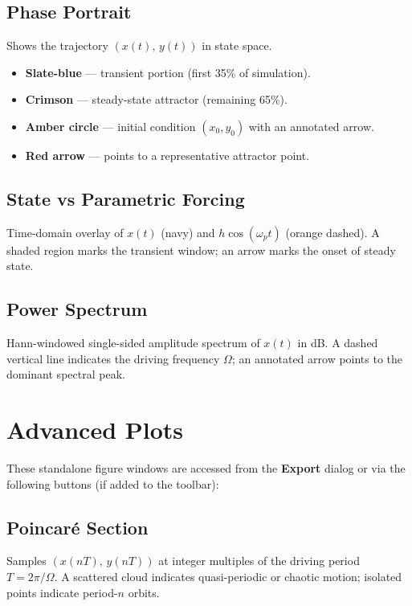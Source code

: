 \documentclass[12pt,a4paper]{article}
\begin{document}
\subsection{Phase Portrait}
Shows the trajectory $(x(t),\, y(t))$ in state space.
\begin{itemize}[noitemsep]
  \item \textbf{Slate-blue} — transient portion (first 35\% of simulation).
  \item \textbf{Crimson} — steady-state attractor (remaining 65\%).
  \item \textbf{Amber circle} — initial condition $(x_0, y_0)$ with an annotated arrow.
  \item \textbf{Red arrow} — points to a representative attractor point.
\end{itemize}

\subsection{State vs Parametric Forcing}
Time-domain overlay of $x(t)$ (navy) and $h\cos(\omega_p t)$ (orange dashed).
A shaded region marks the transient window; an arrow marks the onset of steady state.

\subsection{Power Spectrum}
Hann-windowed single-sided amplitude spectrum of $x(t)$ in dB.
A dashed vertical line indicates the driving frequency $\Omega$; an annotated arrow points to the dominant spectral peak.

\section{Advanced Plots}

These standalone figure windows are accessed from the \textbf{Export} dialog or via the following buttons (if added to the toolbar):

\subsection{Poincar\'e Section}
Samples $(x(nT),\, y(nT))$ at integer multiples of the driving period $T=2\pi/\Omega$.
A scattered cloud indicates quasi-periodic or chaotic motion; isolated points indicate period-$n$ orbits.
\end{document}
